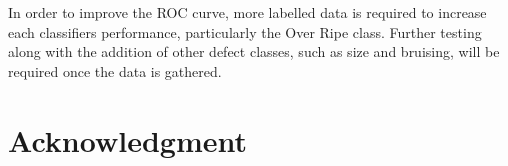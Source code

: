 \documentclass[conference]{IEEEtran}
\begin{document}
In order to improve the ROC curve, more labelled data is required to increase each classifiers performance, particularly the Over Ripe class. Further testing along with the addition of other defect classes, such as size and bruising, will be required once the data is gathered.    







\section*{Acknowledgment}





\end{document}
